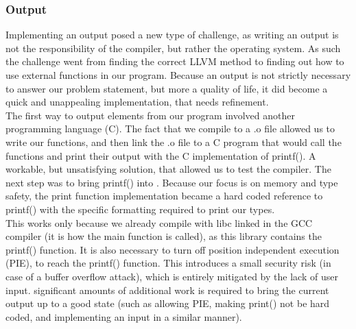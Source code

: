 \subsubsection{Output}
Implementing an output posed a new type of challenge, as writing an output is not the responsibility of the compiler, but rather the operating system. As such the challenge went from finding the correct LLVM method to finding out how to use external functions in our program. Because an output is not strictly necessary to answer our problem statement, but more a quality of life, it did become a quick and unappealing implementation, that needs refinement.\\
The first way to output elements from our  program involved another programming language (C). The fact that we compile to a .o file allowed us to write our functions, and then link the .o file to a C program that would call the \lang{} functions and print their output with the C implementation of printf(). A workable, but unsatisfying solution, that allowed us to test the compiler. The next step was to bring printf() into \lang. Because our focus is on memory and type safety, the print function implementation became a hard coded reference to printf() with the specific formatting required to print our types.\\
This works only because we already compile with libc linked in the GCC compiler (it is how the main function is called), as this library contains the printf() function. It is also necessary to turn off position independent execution (PIE), to reach the printf() function. This introduces a small security risk (in case of a buffer overflow attack), which is entirely mitigated by the lack of user input. significant amounts of additional work is required to bring the current output up to a good state (such as allowing PIE, making print() not be hard coded, and implementing an input in a similar manner).

